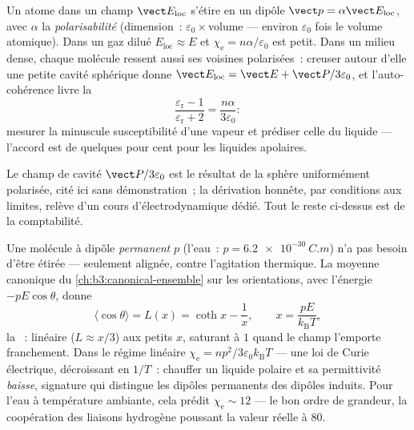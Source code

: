 \begin{proposition}\label{prop:b3:electromagnetism-in-matter:mossotti}
Un atome dans un champ $\vect E_{\text{loc}}$ s'étire en un dipôle
$\vect p = \alpha\vect E_{\text{loc}}$, avec $\alpha$ la
\emph{polarisabilité} (dimension~: $\varepsilon_0\times$volume ---
environ $\varepsilon_0$ fois le volume atomique). Dans un gaz dilué
$E_{\text{loc}} \approx E$ et $\chi_{\text{e}} =
n\alpha/\varepsilon_0$ est petit. Dans un milieu dense, chaque
molécule ressent aussi ses voisines polarisées~: creuser autour d'elle
une petite cavité sphérique donne $\vect E_{\text{loc}} = \vect E + \vect
P/3\varepsilon_0$, et l'auto-cohérence livre la
\emph{}
\[
\frac{\varepsilon_{\text{r}} - 1}{\varepsilon_{\text{r}} + 2}
= \frac{n\alpha}{3\varepsilon_0} :
\]
mesurer la minuscule susceptibilité d'une vapeur et prédiser celle du
liquide --- l'accord est de quelques pour cent pour les liquides
apolaires.
\end{proposition}
\admitted

\begin{remark}
Le champ de cavité $\vect P/3\varepsilon_0$ est le résultat de la
sphère uniformément polarisée, cité ici sans démonstration~; la
dérivation honnête, par conditions aux limites, relève d'un cours
d'électrodynamique dédié. Tout le reste ci-dessus est de la
comptabilité.
\end{remark}

\begin{proposition}\label{prop:b3:electromagnetism-in-matter:langevin}
Une molécule à dipôle \emph{permanent} $p$ (l'eau~:
$p = \qty{6.2e-30}{C.m}$) n'a pas besoin d'être étirée --- seulement
alignée, contre l'agitation thermique. La moyenne canonique du
\cref{ch:b3:canonical-ensemble} sur les orientations, avec l'énergie
$-pE\cos\theta$, donne
\[
\langle\cos\theta\rangle = L(x) = \coth x - \frac1x ,
\qquad x = \frac{pE}{k_{\text{B}}T} ,
\]
la \emph{}~: linéaire ($L \approx x/3$) aux petits
$x$, saturant à $1$ quand le champ l'emporte franchement. Dans le
régime linéaire $\chi_{\text{e}} = np^2/3\varepsilon_0k_{\text{B}}T$
--- une loi de Curie électrique, décroissant en $1/T$~: chauffer un
liquide polaire et sa permittivité \emph{baisse}, signature qui
distingue les dipôles permanents des dipôles induits. Pour l'eau à
température ambiante, cela prédit $\chi_{\text{e}} \sim 12$ --- le bon
ordre de grandeur, la coopération des liaisons hydrogène poussant la
valeur réelle à $80$.
\end{proposition}

